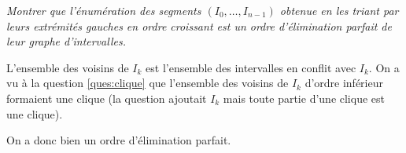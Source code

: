 \begin{Exercise}[title = Cas des graphes d'intervalles]\it
Montrer que l'énumération des segments $(I_0,\dots,I_{n-1})$ obtenue en les triant par leurs extrémités gauches en ordre croissant est un ordre d'élimination parfait de leur graphe d'intervalles.
\end{Exercise}  
\begin{Answer}
L'ensemble des voisins de $I_k$ est l'ensemble des intervalles en conflit avec $I_k$. On a vu à la question \ref{ques:clique} que l'ensemble des voisins de $I_k$ d'ordre inférieur formaient une clique (la question ajoutait $I_k$ mais toute partie d'une clique est une clique).

On a donc bien un ordre d'élimination parfait.
\end{Answer}
\newpage

